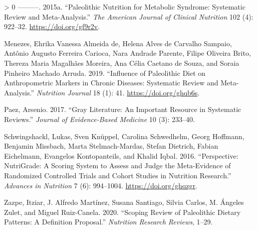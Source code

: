 \documentclass[]{tufte-handout}
\newlength{\cslhangindent}
\newenvironment{CSLReferences}[3] %
 {%
  \setlength{\parindent}{0pt}
  \ifodd #1 \everypar{\setlength{\hangindent}{\cslhangindent}}\ignorespaces\fi
  \ifnum #2 > 0
  \setlength{\parskip}{#2\baselineskip}
  \fi
 }%
 {}
\begin{document}
\begin{CSLReferences}{1}{0}
\leavevmode\hypertarget{ref-manheimerPaleolithicNutritionMetabolic2015a}{}%
---------. 2015a. {``Paleolithic Nutrition for Metabolic Syndrome:
Systematic Review and Meta-Analysis.''} \emph{The American Journal of
Clinical Nutrition} 102 (4): 922--32. \url{https://doi.org/gf9r2v}.

\leavevmode\hypertarget{ref-demenezesInfluencePaleolithicDiet2019a}{}%
Menezes, Ehrika Vanessa Almeida de, Helena Alves de Carvalho Sampaio,
Antônio Augusto Ferreira Carioca, Nara Andrade Parente, Filipe Oliveira
Brito, Thereza Maria Magalhães Moreira, Ana Célia Caetano de Souza, and
Soraia Pinheiro Machado Arruda. 2019. {``Influence of Paleolithic Diet
on Anthropometric Markers in Chronic Diseases: Systematic Review and
Meta-Analysis.''} \emph{Nutrition Journal} 18 (1): 41.
\url{https://doi.org/ghqb6s}.

\leavevmode\hypertarget{ref-paezGrayLiteratureImportant2017}{}%
Paez, Arsenio. 2017. {``Gray Literature: An Important Resource in
Systematic Reviews.''} \emph{Journal of Evidence-Based Medicine} 10 (3):
233--40.

\leavevmode\hypertarget{ref-schwingshacklPerspectiveNutriGradeScoring2016}{}%
Schwingshackl, Lukas, Sven Knüppel, Carolina Schwedhelm, Georg Hoffmann,
Benjamin Missbach, Marta Stelmach-Mardas, Stefan Dietrich, Fabian
Eichelmann, Evangelos Kontopanteils, and Khalid Iqbal. 2016.
{``Perspective: NutriGrade: A Scoring System to Assess and Judge the
Meta-Evidence of Randomized Controlled Trials and Cohort Studies in
Nutrition Research.''} \emph{Advances in Nutrition} 7 (6): 994--1004.
\url{https://doi.org/ghqzgr}.

\leavevmode\hypertarget{ref-zazpeScopingReviewPaleolithic2020}{}%
Zazpe, Itziar, J. Alfredo Martínez, Susana Santiago, Silvia Carlos, M.
Ángeles Zulet, and Miguel Ruiz-Canela. 2020. {``Scoping Review of
Paleolithic Dietary Patterns: A Definition Proposal.''} \emph{Nutrition
Research Reviews}, 1--29.

\end{CSLReferences}
\end{document}
